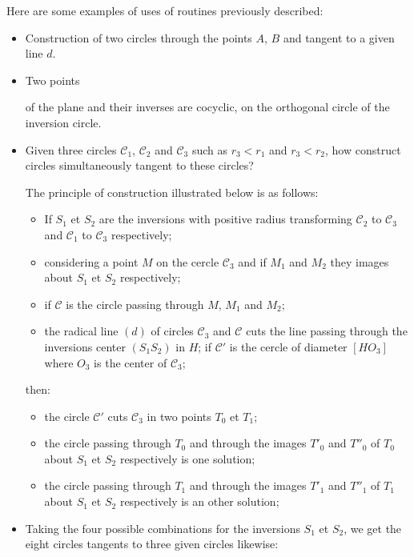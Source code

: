 \documentclass[pdftex]{article}
\begin{document}
Here are some examples of uses of routines previously described:
\begin{itemize}
\item Construction of two circles through the points $A$, $B$ and tangent
  to a given line $d$.
\item \hypertarget{exemple_inversion}{Two points} of the plane and
  their inverses are cocyclic,
  on the orthogonal circle of the inversion circle.
\item Given three circles $\mathscr{C}_{1}$,
  $\mathscr{C}_{2}$ and $\mathscr{C}_{3}$ such as $r_{3}<r_{1}$ and
  $r_{3}<r_{2}$, how construct circles simultaneously tangent to these
  circles?

  The principle of construction illustrated below is as follows:
  \begin{itemize}
  \item If $S_{1}$ et $S_{2}$ are the inversions with positive radius
    transforming $\mathscr{C}_{2}$ to $\mathscr{C}_{3}$ and $\mathscr{C}_{1}$ to
    $\mathscr{C}_{3}$ respectively;
  \item considering a point $M$ on the cercle $\mathscr{C}_{3}$ and
    if $M_{1}$ and $M_{2}$ they images about $S_{1}$ et $S_{2}$ respectively;
  \item if $\mathscr{C}$ is the circle passing through $M$, $M_{1}$ and $M_{2}$;
  \item the radical line $(d)$ of circles $\mathscr{C}_{3}$ and
    $\mathscr{C}$ cuts the line passing through the inversions center
    $(S_{1}S_{2})$ in $H$; if $\mathscr{C'}$ is the cercle of diameter
    $\left[HO_{3}\right]$ where $O_{3}$ is the center of $\mathscr{C}_{3}$;
  \end{itemize}
  then:
  \begin{itemize}
  \item the circle $\mathscr{C'}$ cuts $\mathscr{C}_{3}$ in two points
    $T_{0}$ et $T_{1}$;
  \item the circle passing through $T_{0}$ and through the images $T'_{0}$ and
    $T''_{0}$ of $T_{0}$ about $S_{1}$ et $S_{2}$ respectively is one solution;
  \item the circle passing through $T_{1}$ and through the images $T'_{1}$ and
    $T''_{1}$ of $T_{1}$ about $S_{1}$ et $S_{2}$ respectively is an other solution;
  \end{itemize}
\item Taking the four possible combinations for the inversions
  $S_{1}$ et $S_{2}$, we get the eight circles tangents to three
  given circles likewise:
\end{itemize}
\end{document}
